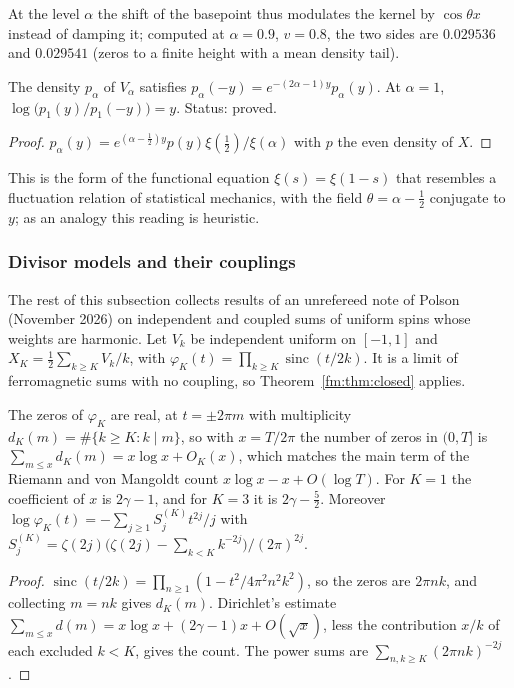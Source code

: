 At the level $\alpha$ the shift of the basepoint thus modulates the kernel by $\cos\theta x$ instead of damping it; computed at $\alpha=0.9$, $v=0.8$, the two sides are $0.029536$ and $0.029541$ (zeros to a finite height with a mean density tail).

\begin{proposition}\label{fm:prop:fluct}
The density $p_\alpha$ of $V_\alpha$ satisfies $p_\alpha(-y)=e^{-(2\alpha-1)y}p_\alpha(y)$. At $\alpha=1$, $\log\bigl(p_1(y)/p_1(-y)\bigr)=y$. Status: proved.
\end{proposition}

\begin{proof}
$p_\alpha(y)=e^{(\alpha-\frac12)y}p(y)\xi(\frac12)/\xi(\alpha)$ with $p$ the even density of $X$.
\end{proof}

This is the form of the functional equation $\xi(s)=\xi(1-s)$ that resembles a fluctuation relation of statistical mechanics, with the field $\theta=\alpha-\frac12$ conjugate to $y$; as an analogy this reading is heuristic.

\subsubsection*{Divisor models and their couplings}

The rest of this subsection collects results of an unrefereed note of Polson (November 2026) on independent and coupled sums of uniform spins whose weights are harmonic. Let $V_k$ be independent uniform on $[-1,1]$ and $X_K=\frac12\sum_{k\ge K}V_k/k$, with $\varphi_K(t)=\prod_{k\ge K}\operatorname{sinc}(t/2k)$. It is a limit of ferromagnetic sums with no coupling, so Theorem~\ref{fm:thm:closed} applies.

\begin{proposition}[proved]\label{fm:prop:divisor}
The zeros of $\varphi_K$ are real, at $t=\pm2\pi m$ with multiplicity $d_K(m)=\#\{k\ge K:k\mid m\}$, so with $x=T/2\pi$ the number of zeros in $(0,T]$ is $\sum_{m\le x}d_K(m)=x\log x+O_K(x)$, which matches the main term of the Riemann and von Mangoldt count $x\log x-x+O(\log T)$. For $K=1$ the coefficient of $x$ is $2\gamma-1$, and for $K=3$ it is $2\gamma-\frac52$. Moreover $\log\varphi_K(t)=-\sum_{j\ge1}S_j^{(K)}t^{2j}/j$ with $S_j^{(K)}=\zeta(2j)\big(\zeta(2j)-\sum_{k<K}k^{-2j}\big)/(2\pi)^{2j}$.
\end{proposition}

\begin{proof}
$\operatorname{sinc}(t/2k)=\prod_{n\ge1}(1-t^2/4\pi^2n^2k^2)$, so the zeros are $2\pi nk$, and collecting $m=nk$ gives $d_K(m)$. Dirichlet's estimate $\sum_{m\le x}d(m)=x\log x+(2\gamma-1)x+O(\sqrt x)$, less the contribution $x/k$ of each excluded $k<K$, gives the count. The power sums are $\sum_{n,k\ge K}(2\pi nk)^{-2j}$.
\end{proof}

